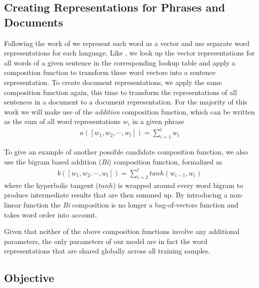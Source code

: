 \documentclass{article} \usepackage{iclr2015,times}
\begin{document}
\subsection{Creating Representations for Phrases and Documents}

Following the work of
\citet{klementiev2012inducing,hermann2014multilingual,gouws2014bilbowa}
we represent each word as a vector and use separate word representations for
each language.
Like \citet{hermann2014multilingual}, we look up the vector representations
for all words of a given sentence in the corresponding lookup table and apply 
a composition function to transform these word vectors into 
a sentence representation.
To create document representations, we apply the same composition function
again, this time to transform the representations of all sentences in a
document to a document representation.
For the majority of this work we will make use of the \emph{addition}
composition function, which can be written as the sum of all word 
representations $w_i$ in a given phrase
\begin{align}
    a([w_1,w_2,\cdots,w_l]) = \sum_{i=1}^{l} w_i
\end{align}

To give an example of another possible candidate composition function,
we also use the bigram based addition (\emph{Bi}) composition function,
formalized as
\begin{align}
    b([w_1,w_2,\cdots,w_l]) = \sum_{i=2}^{l} tanh(w_{i-1},w_i)
\end{align}
where the hyperbolic tangent ($tanh$) is wrapped around every word bigram
to produce intermediate results that are then summed up.
By introducing a non-linear function the \emph{Bi} composition
is no longer a bag-of-vectors function and takes word order into account.

Given that neither of the above composition functions involve any additional
parameters, the only parameters of our model are in fact
the word representations that are shared globally across all training samples.

\subsection{Objective}
\end{document}
